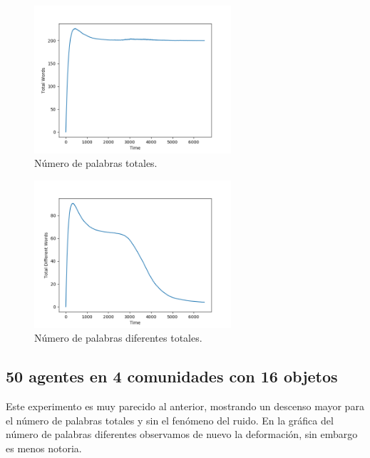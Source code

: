 \documentclass[runningheads]{llncs}
\begin{document}
\begin{figure}[H]
	\centering
	\includegraphics[width=0.65\textwidth]{Figure_113_TotalWords.png}
	\caption{Número de palabras totales.}
	\label{fig_002}
\end{figure}
\begin{figure}[H]
	\centering
	\includegraphics[width=0.65\textwidth]{Figure_113_TotalDifferentWords.png}
	\caption{Número de palabras diferentes totales.}
	\label{fig_003}
\end{figure}
\pagebreak
\subsection{50 agentes en 4 comunidades con 16 objetos}

Este experimento es muy parecido al anterior, mostrando un descenso mayor para el número de palabras totales y sin el fenómeno del ruido. En la gráfica del número de palabras diferentes observamos de nuevo la deformación, sin embargo es menos notoria.
\end{document}
